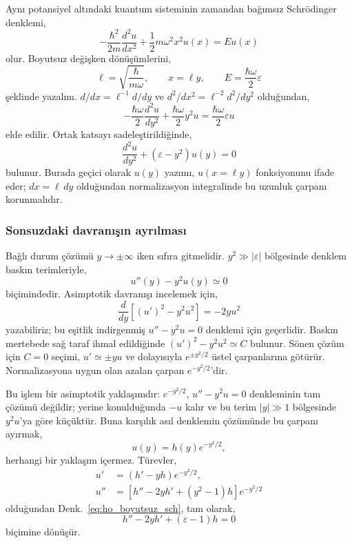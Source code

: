 \documentclass[00_kitap.tex]{subfiles}
\begin{document}
Aynı potansiyel altındaki kuantum sisteminin zamandan bağımsız
Schrödinger denklemi,
\begin{equation}
 -\frac{\hbar^2}{2m}\frac{d^2u}{dx^2}
 +\frac12m\omega^2x^2u(x)=Eu(x)
 \label{eq:ho_sch}
\end{equation}
olur. Boyutsuz değişken dönüşümlerini,
\begin{equation}
 \ell=\sqrt{\frac{\hbar}{m\omega}},\qquad
 x=\ell y,\qquad E=\frac{\hbar\omega}{2}\varepsilon
 \label{eq:ho_boyutsuz}
\end{equation}
şeklinde yazalım. $d/dx=\ell^{-1}d/dy$ ve
$d^2/dx^2=\ell^{-2}d^2/dy^2$ olduğundan,
\begin{equation}
 -\frac{\hbar\omega}{2}\frac{d^2u}{dy^2}
 +\frac{\hbar\omega}{2}y^2u
 =\frac{\hbar\omega}{2}\varepsilon u
\end{equation}
elde edilir. Ortak katsayı sadeleştirildiğinde,
\begin{equation}
 \boxed{\frac{d^2u}{dy^2}+(\varepsilon-y^2)u(y)=0}
 \label{eq:ho_boyutsuz_sch}
\end{equation}
bulunur. Burada geçici olarak $u(y)$ yazımı, $u(x=\ell y)$
fonksiyonunu ifade eder; $dx=\ell\,dy$ olduğundan normalizasyon
integralinde bu uzunluk çarpanı korunmalıdır.

\subsubsection{Sonsuzdaki davranışın ayrılması}

Bağlı durum çözümü $y\to\pm\infty$ iken sıfıra gitmelidir.
$y^2\gg|\varepsilon|$ bölgesinde denklem baskın terimleriyle,
\begin{equation}
 u''(y)-y^2u(y)\simeq0
\end{equation}
biçimindedir. Asimptotik davranışı incelemek için,
\begin{equation}
 \frac{d}{dy}\left[(u')^2-y^2u^2\right]=-2yu^2
 \label{eq:ho_asimptotik_ozdeslik}
\end{equation}
yazabiliriz; bu eşitlik indirgenmiş $u''-y^2u=0$ denklemi için
geçerlidir. Baskın mertebede sağ taraf ihmal edildiğinde
$(u')^2-y^2u^2\simeq C$ bulunur. Sönen çözüm için $C=0$ seçimi,
$u'\simeq\pm yu$ ve dolayısıyla $e^{\pm y^2/2}$ üstel
çarpanlarına götürür. Normalizasyona uygun olan azalan çarpan
$e^{-y^2/2}$'dir.

Bu işlem bir asimptotik yaklaşımdır: $e^{-y^2/2}$,
$u''-y^2u=0$ denkleminin tam çözümü değildir; yerine konulduğunda
$-u$ kalır ve bu terim $|y|\gg1$ bölgesinde $y^2u$'ya göre küçüktür.
Buna karşılık asıl denklemin çözümünde bu çarpanı ayırmak,
\begin{equation}
 u(y)=h(y)e^{-y^2/2},
 \label{eq:ho_ayirma}
\end{equation}
herhangi bir yaklaşım içermez. Türevler,
\begin{align}
 u'&=(h'-yh)e^{-y^2/2},\\
 u''&=[h''-2yh'+(y^2-1)h]e^{-y^2/2}
\end{align}
olduğundan Denk.~\eqref{eq:ho_boyutsuz_sch}, tam olarak,
\begin{equation}
 \boxed{h''-2yh'+(\varepsilon-1)h=0}
 \label{eq:ho_h_denklemi}
\end{equation}
biçimine dönüşür.
\end{document}
